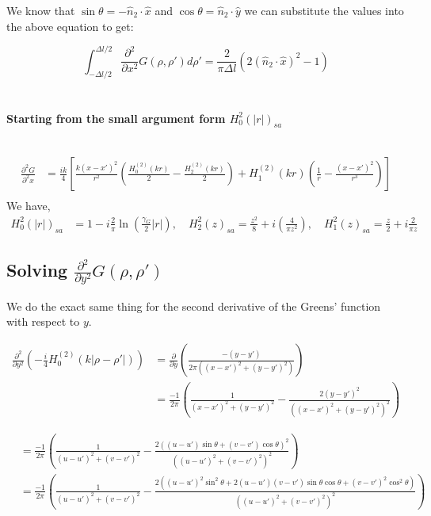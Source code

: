 \documentclass{article}
\newcommand{\0}{\varnothing}
\begin{document}
We know that $\sin\theta = -\hat{n}_2 \cdot \hat{x}$ and $\cos\theta = \hat{n}_2 \cdot \hat{y}$ we can substitute the values into the above equation to get:

\begin{equation}
    \int_{-\Delta l/2}^{\Delta l/2}\frac{\partial^2}{\partial x^2}G(\rho, \rho')d\rho' = \frac{2}{\pi\Delta l}\left(2(\hat{n}_2 \cdot \hat{x})^2 - 1\right)
\end{equation}
\ \\

{\ \\ \centering \bf Starting from the small argument form $H_0^2(|r|)_{sa}$\ \\\ \\}

\begin{align*}
    \frac{\partial^2 G}{\partial^2 x} 
    &= \frac{ik}{4} \left[ \frac{k(x-x')^2}{r^2} \left( \frac{H_{0}^{(2)}(kr)}{2} - \frac{H_{2}^{(2)}(kr)}{2} \right) + 
        H_{1}^{(2)}(kr)\left(\frac{1}{r} - \frac{(x-x')^2}{r^3} \right)  \right] \\
\end{align*}
We have,
\begin{align*}
    H_0^2(|r|)_{sa} &= 1 - i \frac{2}{\pi} \ln \left(\frac{\gamma_G}{2} |r| \right), \quad
    H_2^2(z)_{sa} =  \frac{z^2}{8} + i \left( \frac{4}{\pi z^2} \right), \quad
    H_1^2(z)_{sa} = \frac{z}{2} + i  \frac{2}{\pi z} 
\end{align*}

\subsection{Solving $\frac{\partial^2}{\partial y^2}G(\rho,\rho')$}
We do the exact same thing for the second derivative of the Greens' function with respect to $y$.

\begin{align*}
    \frac{\partial^2}{\partial y^2}\left(-\frac{i}{4}H_0^{(2)}(k|\rho-\rho'|)\right) &= \frac{\partial}{\partial y}\left(\frac{-(y-y')}{2\pi((x-x')^2+(y-y')^2)}\right)\\
        &=\frac{-1}{2\pi}\left(\frac{1}{(x-x')^2+(y-y')^2} - \frac{2(y-y')^2}{((x-x')^2+(y-y')^2)^2}\right)
\end{align*}


\begin{align*}
    &=\frac{-1}{2\pi}\left(\frac{1}{(u-u')^2+(v-v')^2} - \frac{2((u-u')\sin{\theta} + (v-v')\cos{\theta})^2}{((u-u')^2+(v-v')^2)^2}\right)\\
    &=\frac{-1}{2\pi}\left(\frac{1}{(u-u')^2+(v-v')^2} - \frac{2((u-u')^2\sin^2{\theta} + 2(u-u')(v-v')\sin{\theta}\cos{\theta}+(v-v')^2\cos^2{\theta})}{((u-u')^2+(v-v')^2)^2}\right)
\end{align*}
\end{document}
